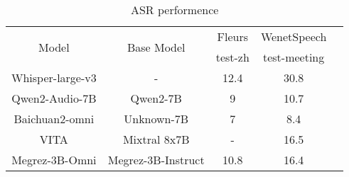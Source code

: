 \begin{table}[t]
\centering
\caption{ASR performence}
\label{tab:asr_perf}
\begin{tabular}{c|cccc}
\toprule
\multirow{2}{*}{Model} & \multirow{2}{*}{Base Model} & Fleurs & WenetSpeech \\
 & & test-zh & test-meeting \\


\midrule
Whisper-large-v3 & -   & 12.4 &  30.8 \\
Qwen2-Audio-7B   & Qwen2-7B  & 9 &  10.7 \\
Baichuan2-omni   & Unknown-7B & 7  &  8.4 \\
VITA             & Mixtral 8x7B & -  & 16.5 \\
\midrule
Megrez-3B-Omni   & Megrez-3B-Instruct  & 10.8  & 16.4 \\
\bottomrule
\end{tabular}
\end{table}